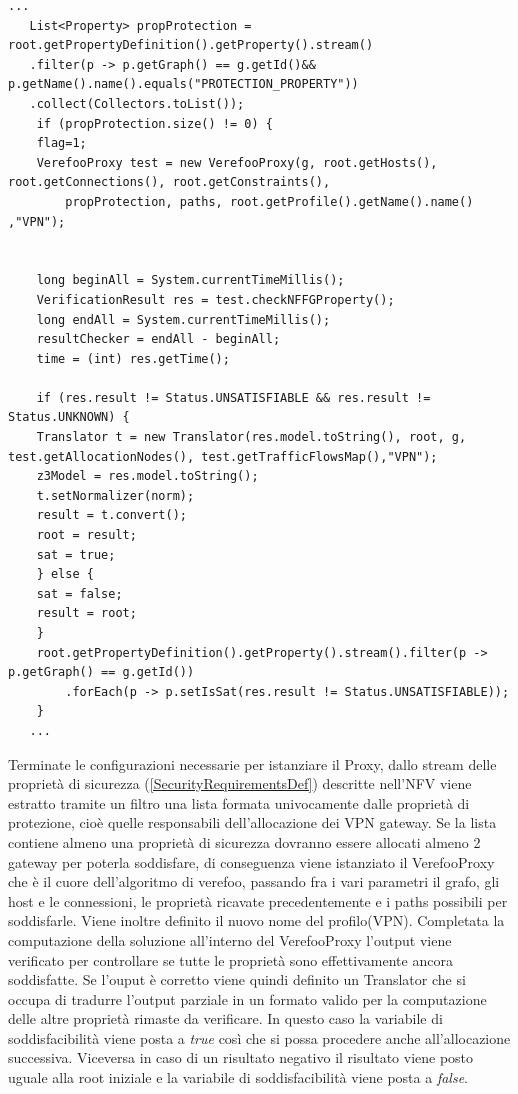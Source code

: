 \begin{lstlisting}[caption={Iterazione di allocazione VPN}, label=lst:java_example3]
   ... 
   List<Property> propProtection = root.getPropertyDefinition().getProperty().stream()
   .filter(p -> p.getGraph() == g.getId()&& p.getName().name().equals("PROTECTION_PROPERTY"))
   .collect(Collectors.toList());
    if (propProtection.size() != 0) {
    flag=1;
    VerefooProxy test = new VerefooProxy(g, root.getHosts(), root.getConnections(), root.getConstraints(),
        propProtection, paths, root.getProfile().getName().name() ,"VPN");

    
    long beginAll = System.currentTimeMillis();
    VerificationResult res = test.checkNFFGProperty();
    long endAll = System.currentTimeMillis();
    resultChecker = endAll - beginAll;
    time = (int) res.getTime();

    if (res.result != Status.UNSATISFIABLE && res.result != Status.UNKNOWN) {
    Translator t = new Translator(res.model.toString(), root, g, test.getAllocationNodes(), test.getTrafficFlowsMap(),"VPN");
    z3Model = res.model.toString();
    t.setNormalizer(norm);
    result = t.convert();
    root = result;
    sat = true;
    } else {
    sat = false;
    result = root;
    }
    root.getPropertyDefinition().getProperty().stream().filter(p -> p.getGraph() == g.getId())
        .forEach(p -> p.setIsSat(res.result != Status.UNSATISFIABLE));
    }
   ...
\end{lstlisting}

Terminate le configurazioni necessarie per istanziare il Proxy, dallo stream delle proprietà di sicurezza (\ref{SecurityRequirementsDef}) descritte nell'NFV
viene estratto tramite un filtro una lista formata univocamente dalle proprietà di protezione, cioè quelle responsabili dell'allocazione dei VPN gateway. Se la lista contiene 
almeno una proprietà di sicurezza dovranno essere allocati almeno 2 gateway per poterla soddisfare, di conseguenza viene istanziato il VerefooProxy che è il cuore dell'algoritmo
di verefoo, passando fra i vari parametri il grafo, gli host e le connessioni, le proprietà ricavate precedentemente e i paths possibili per soddisfarle. Viene inoltre definito il
nuovo nome del profilo(VPN). Completata la computazione della soluzione all'interno del VerefooProxy l'output viene verificato per controllare se tutte le proprietà sono effettivamente
ancora soddisfatte. Se l'ouput è corretto viene quindi definito un Translator che si occupa di tradurre l'output parziale in un formato valido per la computazione delle altre proprietà
rimaste da verificare. In questo caso la variabile di soddisfacibilità viene posta a \textit{true} così che si possa procedere anche all'allocazione successiva. Viceversa in caso di un risultato  
negativo il risultato viene posto uguale alla root iniziale e la variabile di soddisfacibilità viene posta a \textit{false}.


